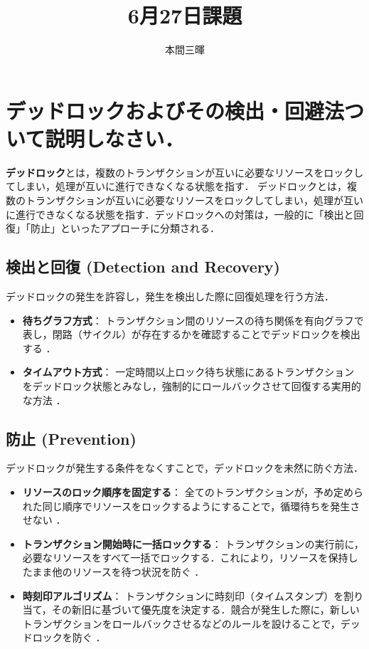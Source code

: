 \documentclass[titlepage,a4paper]{jsarticle}
\title{6月27日課題}
\author{本間三暉}
\begin{document}
\maketitle
\section{デッドロックおよびその検出・回避法ついて説明しなさい．}

\textbf{デッドロック}とは，複数のトランザクションが互いに必要なリソースをロックしてしまい，処理が互いに進行できなくなる状態を指す．
デッドロックとは，複数のトランザクションが互いに必要なリソースをロックしてしまい，処理が互いに進行できなくなる状態を指す．デッドロックへの対策は，一般的に「検出と回復」「防止」といったアプローチに分類される．

\subsection*{検出と回復 (Detection and Recovery)}
デッドロックの発生を許容し，発生を検出した際に回復処理を行う方法．
\begin{itemize}
    \item \textbf{待ちグラフ方式}： トランザクション間のリソースの待ち関係を有向グラフで表し，閉路（サイクル）が存在するかを確認することでデッドロックを検出する ．
    \item \textbf{タイムアウト方式}： 一定時間以上ロック待ち状態にあるトランザクションをデッドロック状態とみなし，強制的にロールバックさせて回復する実用的な方法 ．
\end{itemize}

\subsection*{防止 (Prevention)}
デッドロックが発生する条件をなくすことで，デッドロックを未然に防ぐ方法．
\begin{itemize}
    \item \textbf{リソースのロック順序を固定する}： 全てのトランザクションが，予め定められた同じ順序でリソースをロックするようにすることで，循環待ちを発生させない ．
    \item \textbf{トランザクション開始時に一括ロックする}： トランザクションの実行前に，必要なリソースをすべて一括でロックする．これにより，リソースを保持したまま他のリソースを待つ状況を防ぐ ．
    \item \textbf{時刻印アルゴリズム}： トランザクションに時刻印（タイムスタンプ）を割り当て，その新旧に基づいて優先度を決定する．競合が発生した際に，新しいトランザクションをロールバックさせるなどのルールを設けることで，デッドロックを防ぐ ．
\end{itemize}
\end{document}
